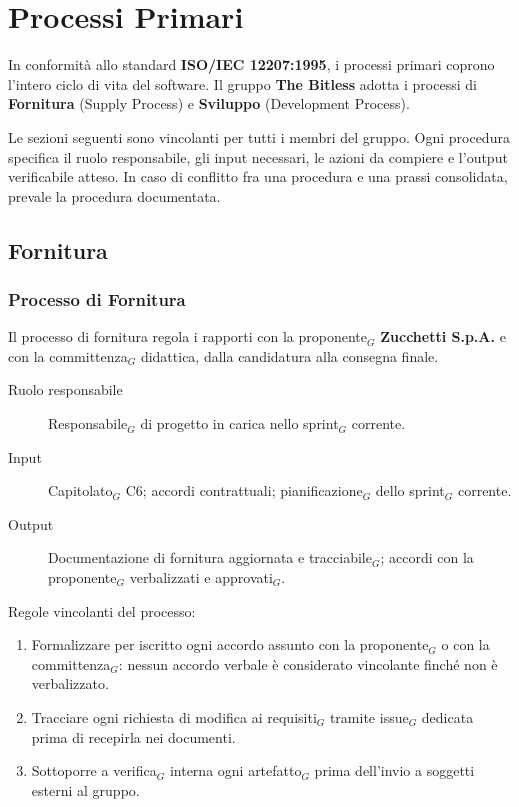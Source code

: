 \documentclass[a4paper, 10pt]{article}
\begin{document}
\section{Processi Primari}
In conformità allo standard \textbf{ISO/IEC 12207:1995}, i processi primari coprono l'intero ciclo di vita del software. Il gruppo \textbf{The Bitless} adotta i processi di \textbf{Fornitura} (Supply Process) e \textbf{Sviluppo} (Development Process).

Le sezioni seguenti sono vincolanti per tutti i membri del gruppo. Ogni procedura specifica il ruolo responsabile, gli input necessari, le azioni da compiere e l'output verificabile atteso. In caso di conflitto fra una procedura e una prassi consolidata, prevale la procedura documentata.

\subsection{Fornitura}
\subsubsection{Processo di Fornitura}
Il processo di fornitura regola i rapporti con la proponente$_G$ \textbf{Zucchetti S.p.A.} e con la committenza$_G$ didattica, dalla candidatura alla consegna finale.

\begin{description}
    \item[Ruolo responsabile] Responsabile$_G$ di progetto in carica nello sprint$_G$ corrente.
    \item[Input] Capitolato$_G$ C6; accordi contrattuali; pianificazione$_G$ dello sprint$_G$ corrente.
    \item[Output] Documentazione di fornitura aggiornata e tracciabile$_G$; accordi con la proponente$_G$ verbalizzati e approvati$_G$.
\end{description}

\noindent Regole vincolanti del processo:
\begin{enumerate}
    \item Formalizzare per iscritto ogni accordo assunto con la proponente$_G$ o con la committenza$_G$: nessun accordo verbale è considerato vincolante finché non è verbalizzato.
    \item Tracciare ogni richiesta di modifica ai requisiti$_G$ tramite issue$_G$ dedicata prima di recepirla nei documenti.
    \item Sottoporre a verifica$_G$ interna ogni artefatto$_G$ prima dell'invio a soggetti esterni al gruppo.
\end{enumerate}
\end{document}
